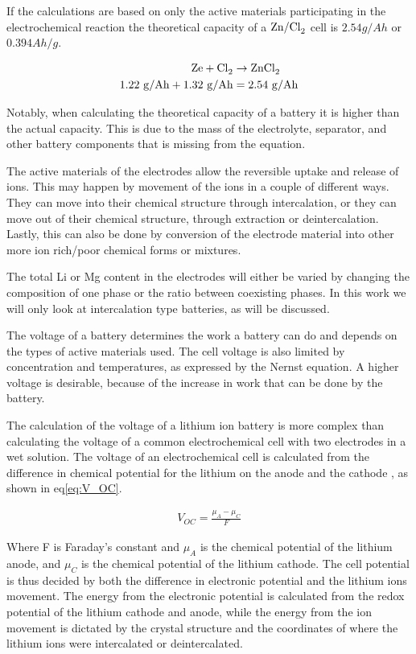 	If the calculations are based on only the active materials participating in the electrochemical reaction the theoretical capacity of a $\ce{Zn/Cl_2}$ cell is $2.54\text{} \si{g/Ah}$ or $0.394\text{} \si{Ah/g}$.
	

	\begin{align}
	\ce{Ze} + \ce{Cl_2} &\rightarrow \ce{ZnCl_2}\\
	1.22\text{ } \si{g/Ah} + 1.32\text{ } \si{g/Ah} &= 2.54\text{ } \si{g/Ah}
	\end{align}
	
	Notably, when calculating the theoretical capacity of a battery it is higher than the actual capacity. This is due to the mass of the electrolyte, separator, and other battery components that is missing from the equation.
	
	The active materials of the electrodes allow the reversible uptake and release of ions. This may happen by movement of the ions in a couple of different ways. They can move into their chemical structure through intercalation, or they can move out of their chemical structure, through extraction or deintercalation. Lastly, this can also be done by conversion of the electrode material into other more ion rich/poor chemical forms or mixtures.
	
	The total Li or Mg content in the electrodes will either be varied by changing the composition of one phase or the ratio between coexisting phases. In this work we will only look at intercalation type batteries, as will be discussed.
		
The voltage of a battery determines the work a battery can do and depends on the types of active materials used. The cell voltage is also limited by concentration and temperatures, as expressed by the Nernst equation. A higher voltage is desirable, because of the increase in work that can be done by the battery.

The calculation of the voltage of a lithium ion battery is more complex than calculating the voltage of a common electrochemical cell with two electrodes in a wet solution. The voltage of an electrochemical cell is calculated from the difference in chemical potential for the lithium on the anode and the cathode \cite{aydinol1997first}, as shown in eq\ref{eq:V_OC}.

\begin{align}\label{eq:V_OC}
V_{OC} = \frac{\mu_A - \mu_C}{F}
\end{align}

Where F is Faraday's constant and $\mu_A$ is the chemical potential of the lithium anode, and $\mu_C$ is the chemical potential of the lithium cathode. The cell potential is thus decided by both the difference in electronic potential and the lithium ions movement. The energy from the electronic potential is calculated from the redox potential of the lithium cathode and anode, while the energy from the ion movement is dictated by the crystal structure and the coordinates of where the lithium ions were intercalated or deintercalated.

